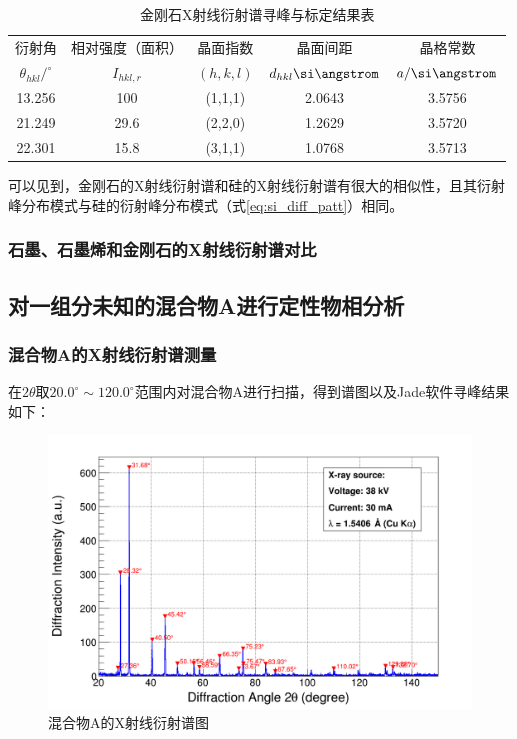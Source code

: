 \documentclass{thuemp}
\begin{document}
\begin{table}
    \centering
    \captionnamefont{\wuhao\bf\heiti}
    \captiontitlefont{\wuhao\bf\heiti}
    \caption{金刚石X射线衍射谱寻峰与标定结果表}
    \label{tab:diamond_xrd}
    \liuhao
    \begin{tabular}{ccccc}
        \toprule
        衍射角 & 相对强度（面积）& 晶面指数 & 晶面间距 & 晶格常数 \\
        $\theta_{hkl}/^\circ$ & $I_{hkl,r}$ & $(h,k,l)$ & $d_{hkl}\text{\si\angstrom}$ & $a/\text{\si\angstrom}$\\
        \midrule
        13.256 &  100 & (1,1,1) &  2.0643 & 3.5756 \\
        21.249 & 29.6 & (2,2,0) &  1.2629 & 3.5720 \\
        22.301 & 15.8 & (3,1,1) &  1.0768 & 3.5713 \\
        \bottomrule
    \end{tabular}
\end{table}

可以见到，金刚石的X射线衍射谱和硅的X射线衍射谱有很大的相似性，且其衍射峰分布模式与硅的衍射峰分布模式（式\ref{eq:si_diff_patt}）相同。

\subsubsection{石墨、石墨烯和金刚石的X射线衍射谱对比}



\subsection{对一组分未知的混合物A进行定性物相分析}

\subsubsection{混合物A的X射线衍射谱测量}

在$2\theta$取$20.0^\circ \sim 120.0^\circ$范围内对混合物A进行扫描，得到谱图以及Jade软件寻峰结果如下：

\begin{figure}[H]
    \centering
    \includegraphics[width=0.8\linewidth]{../Data/Mixture.png}
    \caption{混合物A的X射线衍射谱图}
    \label{fig:mixture_a_xrd}
\end{figure}
\end{document}
